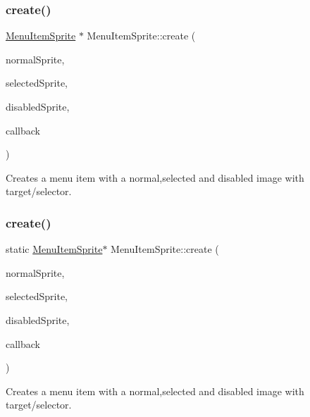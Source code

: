 \subsubsection{\texorpdfstring{create()}{create()}\hspace{0.1cm}{\footnotesize\ttfamily [9/10]}}
{\footnotesize\ttfamily \hyperlink{classMenuItemSprite}{Menu\+Item\+Sprite} $\ast$ Menu\+Item\+Sprite\+::create (\begin{DoxyParamCaption}\item[{\hyperlink{classNode}{Node} $\ast$}]{normal\+Sprite,  }\item[{\hyperlink{classNode}{Node} $\ast$}]{selected\+Sprite,  }\item[{\hyperlink{classNode}{Node} $\ast$}]{disabled\+Sprite,  }\item[{const cc\+Menu\+Callback \&}]{callback }\end{DoxyParamCaption})\hspace{0.3cm}{\ttfamily [static]}}

Creates a menu item with a normal,selected and disabled image with target/selector. \mbox{\label{classMenuItemSprite_a61f865d1132532026c4bee8a55ce9a50}} 
\subsubsection{\texorpdfstring{create()}{create()}\hspace{0.1cm}{\footnotesize\ttfamily [10/10]}}
{\footnotesize\ttfamily static \hyperlink{classMenuItemSprite}{Menu\+Item\+Sprite}$\ast$ Menu\+Item\+Sprite\+::create (\begin{DoxyParamCaption}\item[{\hyperlink{classNode}{Node} $\ast$}]{normal\+Sprite,  }\item[{\hyperlink{classNode}{Node} $\ast$}]{selected\+Sprite,  }\item[{\hyperlink{classNode}{Node} $\ast$}]{disabled\+Sprite,  }\item[{const cc\+Menu\+Callback \&}]{callback }\end{DoxyParamCaption})\hspace{0.3cm}{\ttfamily [static]}}

Creates a menu item with a normal,selected and disabled image with target/selector. \mbox{\label{classMenuItemSprite_a9db9e0e79bfc17d27f697a69b023b0c5}} 
